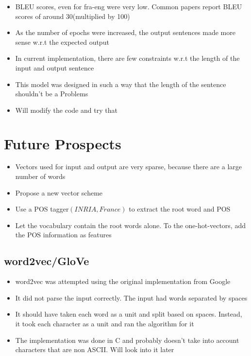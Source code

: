 \documentclass[11pt]{article}
\begin{document}
\begin{itemize}
					
	\item BLEU scores, even for fra-eng were very low. Common papers report BLEU scores of around 30(multiplied by 100)
	\item As the number of epochs were increased, the output sentences made more sense w.r.t the expected output
	\item In current implementation, there are few constraints w.r.t the length of the input and output sentence
	\item This model was designed in such a way that the length of the sentence shouldn't be a Problems
	\item Will modify the code and try that
\end{itemize}

\section{Future Prospects}
\begin{itemize}
	\item Vectors used for input and output are very sparse, because there are a large number of words
	\item Propose a new vector scheme
	\item Use a POS tagger$(INRIA, France)$ to extract the root word and POS
	\item Let the vocabulary contain the root words alone. To the one-hot-vectors, add the POS information as features
\end{itemize}
\subsection{word2vec/GloVe}
\begin{itemize}
	\item word2vec was attempted using the original implementation from Google
	\item It did not parse the input correctly. The input had words separated by spaces
	\item It should have taken each word as a unit and split
	      based on spaces. Instead, it took each character as a unit and ran the algorithm for it
	\item The implementation was done in C and probably doesn't take into account characters that are non ASCII. Will look into it later
\end{itemize}
\end{document}
